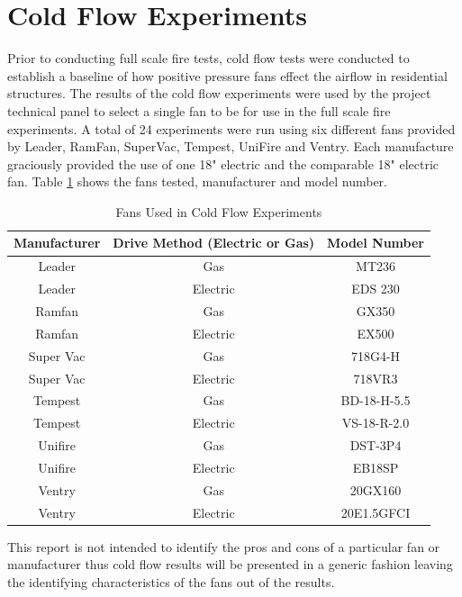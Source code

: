 \documentclass{article}
\begin{document}
\clearpage

\section{Cold Flow Experiments}
Prior to conducting full scale fire tests, cold flow tests were conducted to establish a baseline of how positive pressure fans effect the airflow in residential structures. The results of the cold flow experiments were used by the project technical panel to select a single fan to be for use in the full scale fire experiments. A total of 24 experiments were run using six different fans provided by Leader, RamFan, SuperVac, Tempest, UniFire and Ventry. Each manufacture graciously provided the use of one 18" electric and the comparable 18" electric fan. Table \ref{table:cold_flow_Fans} shows the fans tested, manufacturer and model number. 

\begin{table}[H]
	\centering
	\caption{Fans Used in Cold Flow Experiments}
	\begin{tabular}{|c|c|c|}
		\hline
		Manufacturer & Drive Method (Electric or Gas) & Model Number \\ \hline \hline
		Leader & Gas & MT236 \\ \hline
		Leader & Electric & EDS 230 \\ \hline
		Ramfan & Gas & GX350 \\ \hline
		Ramfan & Electric & EX500 \\ \hline
		Super Vac & Gas & 718G4-H \\ \hline
		Super Vac & Electric & 718VR3 \\ \hline
		Tempest & Gas & BD-18-H-5.5 \\ \hline
		Tempest & Electric & VS-18-R-2.0 \\ \hline
		Unifire & Gas & DST-3P4 \\ \hline
		Unifire & Electric & EB18SP \\ \hline
		Ventry & Gas & 20GX160 \\ \hline
		Ventry & Electric & 20E1.5GFCI \\ \hline
	\end{tabular}
	\label{table:cold_flow_Fans}
\end{table}

This report is not intended to identify the pros and cons of a particular fan or manufacturer thus cold flow results will be presented in a generic fashion leaving the identifying characteristics of the fans out of the results. 
\end{document}
